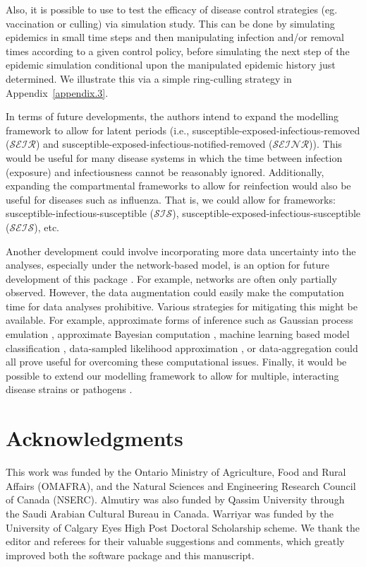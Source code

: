 \documentclass[nojss,shortnames]{jss}
\begin{document}
Also, it is possible to use  to test the efficacy of disease control strategies (eg. vaccination or culling) via simulation study. This can be done by simulating epidemics in small time steps and then manipulating infection and/or removal times according to a given control policy, before simulating the next step of the epidemic simulation conditional upon the manipulated epidemic history just determined. We illustrate this via a simple ring-culling strategy in Appendix~\ref{appendix.3}.

In terms of future developments, the authors intend to expand the modelling framework to allow for latent periods (i.e., susceptible-exposed-infectious-removed ($\mathcal{SEIR}$) and susceptible-exposed-infectious-notified-removed ($\mathcal{SEINR}$)). This would be useful for many disease systems in which the time between infection (exposure) and infectiousness cannot be reasonably ignored. Additionally, expanding the compartmental frameworks to allow for reinfection would also be useful for diseases such as influenza. That is, we could allow for frameworks: susceptible-infectious-susceptible ($\mathcal{SIS}$), susceptible-exposed-infectious-susceptible ($\mathcal{SEIS}$), etc.    

Another development could involve incorporating more data uncertainty into the analyses, especially under the network-based model, is an option for future development of this package . For example, networks are often only partially observed. However, the data augmentation could easily make the computation time for data analyses prohibitive. Various strategies for mitigating this might be available. 
For example, approximate forms of inference such as Gaussian process emulation \citep{pokharel2016gaussian}, approximate Bayesian computation \citep{beaumont2009adaptive}, machine learning based model classification \citep{pokharel2014supervised}, data-sampled likelihood approximation \citep{malik2016parameterizing}, or data-aggregation \citep{deeth2016spatial} could all prove useful for overcoming these computational issues. Finally, it would be possible to extend our modelling framework to allow for multiple, interacting disease strains or pathogens \citep{romanescu2016modeling}.  

\section*{Acknowledgments}

This work was funded by the Ontario Ministry of Agriculture, Food and Rural Affairs (OMAFRA), and the Natural Sciences and Engineering Research Council of Canada (NSERC). Almutiry was also funded by Qassim University through the Saudi Arabian Cultural Bureau in Canada. Warriyar was funded by the University of Calgary Eyes High Post Doctoral Scholarship scheme. We thank the editor and referees for their valuable suggestions and comments, which greatly improved both the software package and this manuscript.
\end{document}

